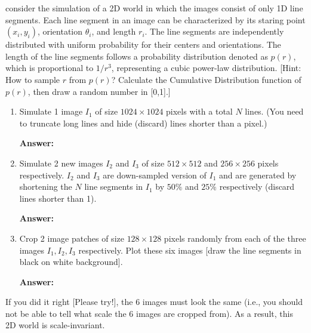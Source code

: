 \documentclass[11pt]{article}
\newcommand{\Answer}{\color{red}\textbf{Answer:} \color{black}}
\begin{document}
 consider the simulation of a 2D world in which the images consist of only 1D line segments. Each line segment in an image can be characterized by its staring point $(x_i, y_i)$, orientation $\theta_i$, and length $r_i$. The line segments are independently distributed with uniform probability for their centers and orientations. The length of the line segments follows a probability distribution denoted as $p(r)$, which is proportional to $1/r^3$, representing a cubic power-law distribution. [Hint: How to sample $r$ from $p(r)$? Calculate the Cumulative Distribution function of $p(r)$, then draw a random number in [0,1].]

\begin{enumerate}
\item Simulate 1 image $I_1$ of size $1024 \times 1024$ pixels
with a total $N$ lines. (You need to truncate long lines and hide (discard) lines shorter than a pixel.)

\Answer

\item Simulate 2 new images $I_2$ and $I_3$ of size $512 \times 512$ and $256 \times 256$ pixels respectively. $I_2$ and $I_3$ are down-sampled version of $I_1$ and are generated by shortening the $N$ line segments in $I_1$ by $50\%$ and $25\%$ respectively (discard lines shorter than 1).

\Answer

\item Crop 2 image patches of size $128 \times 128$ pixels randomly from each of the three images $I_1, I_2, I_3$ respectively. Plot these six images [draw the line segments in black on white background].

\Answer
\end{enumerate}

If you did it right [Please try!], the 6 images must look the same (i.e., you should not be able to tell what scale the 6 images are cropped from). As a result, this 2D world is scale-invariant.
\end{document}

